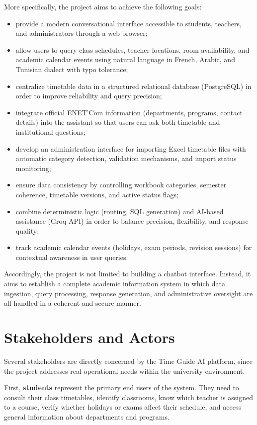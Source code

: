 More specifically, the project aims to achieve the following goals:
\begin{itemize}
    \item provide a modern conversational interface accessible to students, teachers, and administrators through a web browser;
    \item allow users to query class schedules, teacher locations, room availability, and academic calendar events using natural language in French, Arabic, and Tunisian dialect with typo tolerance;
    \item centralize timetable data in a structured relational database (PostgreSQL) in order to improve reliability and query precision;
    \item integrate official ENET'Com information (departments, programs, contact details) into the assistant so that users can ask both timetable and institutional questions;
    \item develop an administration interface for importing Excel timetable files with automatic category detection, validation mechanisms, and import status monitoring;
    \item ensure data consistency by controlling workbook categories, semester coherence, timetable versions, and active status flags;
    \item combine deterministic logic (routing, SQL generation) and AI-based assistance (Groq API) in order to balance precision, flexibility, and response quality;
    \item track academic calendar events (holidays, exam periods, revision sessions) for contextual awareness in user queries.
\end{itemize}

Accordingly, the project is not limited to building a chatbot interface. Instead, it aims to establish a complete academic information system in which data ingestion, query processing, response generation, and administrative oversight are all handled in a coherent and secure manner.

\section{Stakeholders and Actors}
Several stakeholders are directly concerned by the Time Guide AI platform, since the project addresses real operational needs within the university environment.

First, \textbf{students} represent the primary end users of the system. They need to consult their class timetables, identify classrooms, know which teacher is assigned to a course, verify whether holidays or exams affect their schedule, and access general information about departments and programs.


